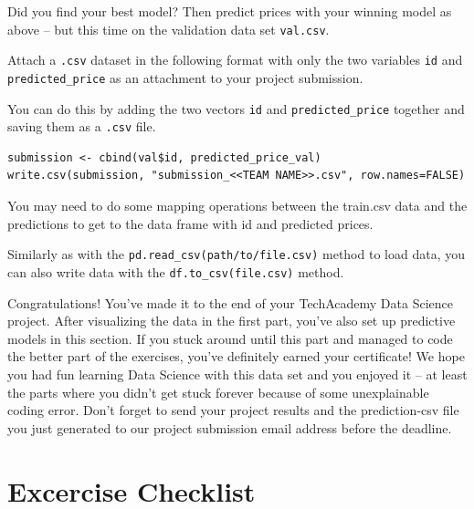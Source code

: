 \documentclass[
  11pt,
]{book}
\newenvironment{tips}[1]
  {
  \begin{itemize}
  \footnotesize
  \renewcommand{\labelitemi}{
    \raisebox{-.7\height}[0pt][0pt]{
      {\setkeys{Gin}{width=3em,keepaspectratio}
        \texttt{[image: images/\#1.png]}}
    }
  }
  \setlength{\fboxsep}{1em}
  \begin{rbox}
  \item
  }
  {
  \end{rbox}
  \end{itemize}
  }
\newenvironment{tipsp}[1]
  {
  \begin{itemize}
  \footnotesize
  \renewcommand{\labelitemi}{
    \raisebox{-.7\height}[0pt][0pt]{
      {\setkeys{Gin}{width=3em,keepaspectratio}
        \texttt{[image: images/\#1.png]}}
    }
  }
  \setlength{\fboxsep}{1em}
  \begin{pbox}
  \item
  }
  {
  \end{pbox}
  \end{itemize}
  }
\begin{document}
Did you find your best model? Then predict prices with your winning model as above -- but this time on the validation data set \texttt{val.csv}.

Attach a \texttt{.csv} dataset in the following format with only the two variables \texttt{id} and \texttt{predicted\_price} as an attachment to your project submission.

\begin{tips}r

You can do this by adding the two vectors \texttt{id} and \texttt{predicted\_price} together and saving them as a \texttt{.csv} file.

\begin{verbatim}
submission <- cbind(val$id, predicted_price_val)
write.csv(submission, "submission_<<TEAM NAME>>.csv", row.names=FALSE)
\end{verbatim}

\end{tips}

\begin{tipsp}p

You may need to do some mapping operations between the train.csv data and the predictions to get to the data frame with id and predicted prices.

Similarly as with the \texttt{pd.read\_csv(path/to/file.csv)} method to load data, you can also write data with the \texttt{df.to\_csv(file.csv)} method.

\end{tipsp}

Congratulations! You've made it to the end of your TechAcademy Data Science project. After visualizing the data in the first part, you've also set up predictive models in this section. If you stuck around until this part and managed to code the better part of the exercises, you've definitely earned your certificate! We hope you had fun learning Data Science with this data set and you enjoyed it -- at least the parts where you didn't get stuck forever because of some unexplainable coding error. Don't forget to send your project results and the prediction-csv file you just generated to our project submission email address before the deadline.

\newpage

\hypertarget{excercise-checklist}{%
\chapter{Excercise Checklist}\label{excercise-checklist}}
\end{document}
